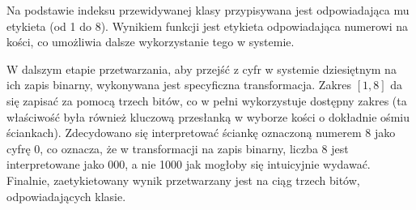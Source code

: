 Na podstawie indeksu przewidywanej klasy przypisywana jest odpowiadająca mu etykieta (od 1 do 8).
Wynikiem funkcji jest etykieta odpowiadająca numerowi na kości,
co umożliwia dalsze wykorzystanie tego w systemie.

W dalszym etapie przetwarzania, aby przejść z cyfr w systemie dziesiętnym na ich zapis binarny, wykonywana jest specyficzna transformacja.
Zakres $[1, 8]$ da się zapisać za pomocą trzech bitów, co w pełni wykorzystuje dostępny zakres (ta właściwość była również kluczową przesłanką w wyborze kości o dokładnie ośmiu ściankach).
Zdecydowano się interpretować ściankę oznaczoną numerem 8 jako cyfrę 0, co oznacza, że w transformacji na zapis binarny,
liczba 8 jest interpretowane jako 000, a nie 1000 jak mogłoby się intuicyjnie wydawać.
Finalnie, zaetykietowany wynik przetwarzany jest na ciąg trzech bitów, odpowiadających klasie.

